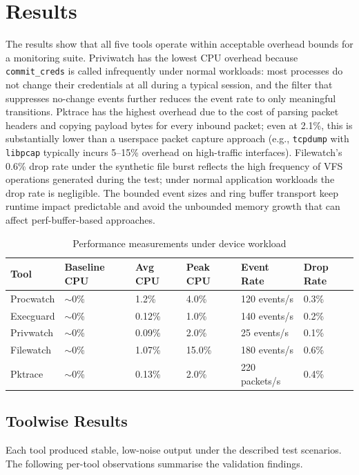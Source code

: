\documentclass{mnitjaipur}
\begin{document}
\chapter{Results}
\label{ch:results}
The results show that all five tools operate within acceptable overhead bounds for a monitoring suite. Priviwatch has the lowest CPU overhead because \texttt{commit\_creds} is called infrequently under normal workloads: most processes do not change their credentials at all during a typical session, and the filter that suppresses no-change events further reduces the event rate to only meaningful transitions. Pktrace has the highest overhead due to the cost of parsing packet headers and copying payload bytes for every inbound packet; even at 2.1\%, this is substantially lower than a userspace packet capture approach (e.g., \texttt{tcpdump} with \texttt{libpcap} typically incurs 5--15\% overhead on high-traffic interfaces). Filewatch's 0.6\% drop rate under the synthetic file burst reflects the high frequency of VFS operations generated during the test; under normal application workloads the drop rate is negligible. The bounded event sizes and ring buffer transport keep runtime impact predictable and avoid the unbounded memory growth that can affect perf-buffer-based approaches.

\begin{table}[H]
  \centering
  \caption{Performance measurements under device workload}
  \begin{tabular}{|p{}|p{}|p{}|p{}|p{}|p{}|}
    \hline
    \textbf{Tool} & \textbf{Baseline CPU} & \textbf{Avg CPU} & \textbf{Peak CPU} & \textbf{Event Rate} & \textbf{Drop Rate} \\ \hline
    Procwatch  & $\sim$0\% & 1.2\% & 4.0\%  & 120 events/s & 0.3\% \\ \hline
    Execguard  & $\sim$0\% & 0.12\% & 1.0\% & 140 events/s & 0.2\% \\ \hline
    Privwatch  & $\sim$0\% & 0.09\% & 2.0\% & 25 events/s  & 0.1\% \\ \hline
    Filewatch  & $\sim$0\% & 1.07\% & 15.0\% & 180 events/s & 0.6\% \\ \hline
    Pktrace    & $\sim$0\% & 0.13\% & 2.0\% & 220 packets/s & 0.4\% \\ \hline
  \end{tabular}
\end{table}

\section{Toolwise Results}
Each tool produced stable, low-noise output under the described test scenarios. The following per-tool observations summarise the validation findings.
\end{document}
